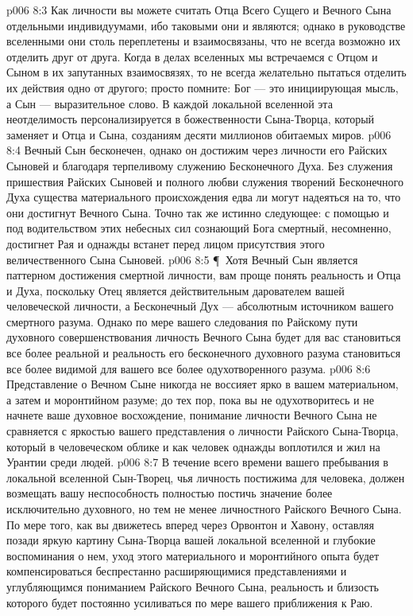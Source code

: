 \vs p006 8:3 Как личности вы можете считать Отца Всего Сущего и Вечного Сына отдельными индивидуумами, ибо таковыми они и являются; однако в руководстве вселенными они столь переплетены и взаимосвязаны, что не всегда возможно их отделить друг от друга. Когда в делах вселенных мы встречаемся с Отцом и Сыном в их запутанных взаимосвязях, то не всегда желательно пытаться отделить их действия одно от другого; просто помните: Бог --- это инициирующая мысль, а Сын --- выразительное слово. В каждой локальной вселенной эта неотделимость персонализируется в божественности Сына\hyp{}Творца, который заменяет и Отца и Сына, созданиям десяти миллионов обитаемых миров.
\vs p006 8:4 Вечный Сын бесконечен, однако он достижим через личности его Райских Сыновей и благодаря терпеливому служению Бесконечного Духа. Без служения пришествия Райских Сыновей и полного любви служения творений Бесконечного Духа существа материального происхождения едва ли могут надеяться на то, что они достигнут Вечного Сына. Точно так же истинно следующее: с помощью и под водительством этих небесных сил сознающий Бога смертный, несомненно, достигнет Рая и однажды встанет перед лицом присутствия этого величественного Сына Сыновей.
\vs p006 8:5 \P\ Хотя Вечный Сын является паттерном достижения смертной личности, вам проще понять реальность и Отца и Духа, поскольку Отец является действительным дарователем вашей человеческой личности, а Бесконечный Дух --- абсолютным источником вашего смертного разума. Однако по мере вашего следования по Райскому пути духовного совершенствования личность Вечного Сына будет для вас становиться все более реальной и реальность его бесконечного духовного разума становиться все более видимой для вашего все более одухотворенного разума.
\vs p006 8:6 Представление о Вечном Сыне никогда не воссияет ярко в вашем материальном, а затем и моронтийном разуме; до тех пор, пока вы не одухотворитесь и не начнете ваше духовное восхождение, понимание личности Вечного Сына не сравняется с яркостью вашего представления о личности Райского Сына\hyp{}Творца, который в человеческом облике и как человек однажды воплотился и жил на Урантии среди людей.
\vs p006 8:7 В течение всего времени вашего пребывания в локальной вселенной Сын\hyp{}Творец, чья личность постижима для человека, должен возмещать вашу неспособность полностью постичь значение более исключительно духовного, но тем не менее личностного Райского Вечного Сына. По мере того, как вы движетесь вперед через Орвонтон и Хавону, оставляя позади яркую картину Сына\hyp{}Творца вашей локальной вселенной и глубокие воспоминания о нем, уход этого материального и моронтийного опыта будет компенсироваться беспрестанно расширяющимися представлениями и углубляющимся пониманием Райского Вечного Сына, реальность и близость которого будет постоянно усиливаться по мере вашего приближения к Раю.
